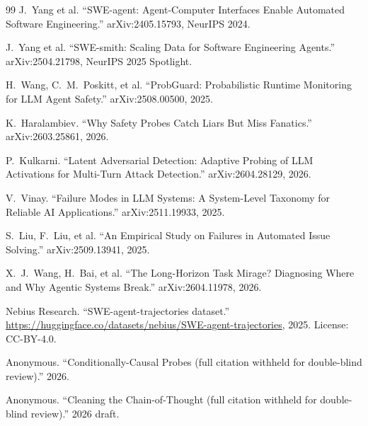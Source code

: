 \documentclass[11pt]{article}
\begin{document}
\begin{thebibliography}{99}
J.~Yang et al.
``SWE-agent: Agent-Computer Interfaces Enable Automated Software Engineering.'' arXiv:2405.15793, NeurIPS 2024.

J.~Yang et al.
``SWE-smith: Scaling Data for Software Engineering Agents.'' arXiv:2504.21798, NeurIPS 2025 Spotlight.

H.~Wang, C.~M.~Poskitt, et al.
``ProbGuard: Probabilistic Runtime Monitoring for LLM Agent Safety.'' arXiv:2508.00500, 2025.

K.~Haralambiev.
``Why Safety Probes Catch Liars But Miss Fanatics.'' arXiv:2603.25861, 2026.

P.~Kulkarni.
``Latent Adversarial Detection: Adaptive Probing of LLM Activations for Multi-Turn Attack Detection.'' arXiv:2604.28129, 2026.

V.~Vinay.
``Failure Modes in LLM Systems: A System-Level Taxonomy for Reliable AI Applications.'' arXiv:2511.19933, 2025.

S.~Liu, F.~Liu, et al.
``An Empirical Study on Failures in Automated Issue Solving.'' arXiv:2509.13941, 2025.

X.~J.~Wang, H.~Bai, et al.
``The Long-Horizon Task Mirage? Diagnosing Where and Why Agentic Systems Break.'' arXiv:2604.11978, 2026.

Nebius Research.
``SWE-agent-trajectories dataset.''
\url{https://huggingface.co/datasets/nebius/SWE-agent-trajectories}, 2025. License: CC-BY-4.0.

Anonymous.
``Conditionally-Causal Probes (full citation withheld for double-blind review).'' 2026.

Anonymous.
``Cleaning the Chain-of-Thought (full citation withheld for double-blind review).'' 2026 draft.

\end{thebibliography}
\end{document}
